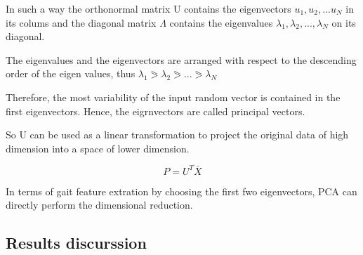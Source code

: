 In such a way the orthonormal matrix U contains the eigenvectors $u_{1}, u_{2},...u_{N}$ in its colums and the diagonal matrix $\Lambda$ contains the eigenvalues $\lambda_{1}, \lambda_{2},...,\lambda_{N}$ on its diagonal.

The eigenvalues and the eigenvectors are arranged with respect to the descending order of the eigen values, thus $\lambda_{1}\eqslantgtr\lambda_{2}\eqslantgtr...\eqslantgtr\lambda_{N}$

Therefore, the most variability of the input random vector is contained in the first eigenvectors. Hence, the eigrnvectors are called principal vectors.

So U can be used as a linear transformation to project the original data of high dimension into a space of lower dimension.

$$P=U^T\bar{X}$$

In terms of gait feature extration by choosing the first fwo eigenvectors, PCA can directly perform the dimensional reduction\cite{Jeon}.

\subsection{Results discurssion}

